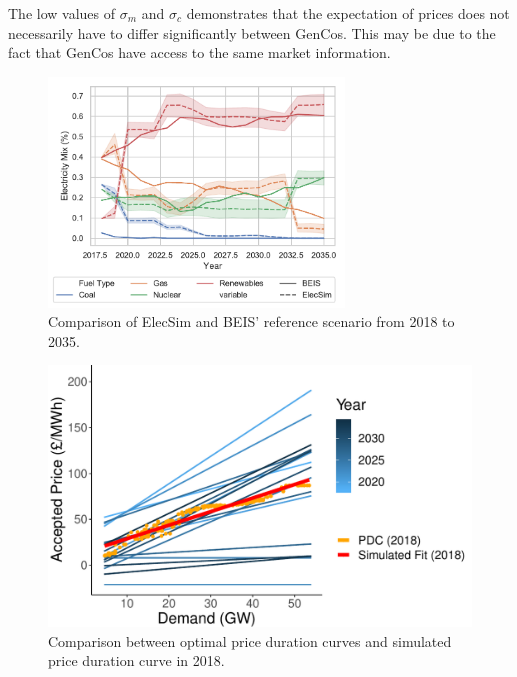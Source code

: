 The low values of $\sigma_m$ and $\sigma_c$ demonstrates that the expectation of prices does not necessarily have to differ significantly between GenCos. This may be due to the fact that GenCos have access to the same market information.


\begin{figure}
	\centering
	\includegraphics[width=0.7\textwidth]{Chapter4/figures/e-Energy-2020/results/scenario_analysis/best_forward_scenario_below_legend.pdf}
	\caption{Comparison of ElecSim and BEIS' reference scenario from 2018 to 2035.}
	\label{fig:forward_scenario_beis_elecsim}
\end{figure}


\begin{figure}
	\centering
	\includegraphics[width=\textwidth, height=\textwidth, keepaspectratio]{Chapter4/figures/e-Energy-2020/results/scenario_analysis/optimal_pdc_prices.pdf}
	\caption{Comparison between optimal price duration curves and simulated price duration curve in 2018.}
	\label{fig:forward_scenario_best_pdcs}
\end{figure}


